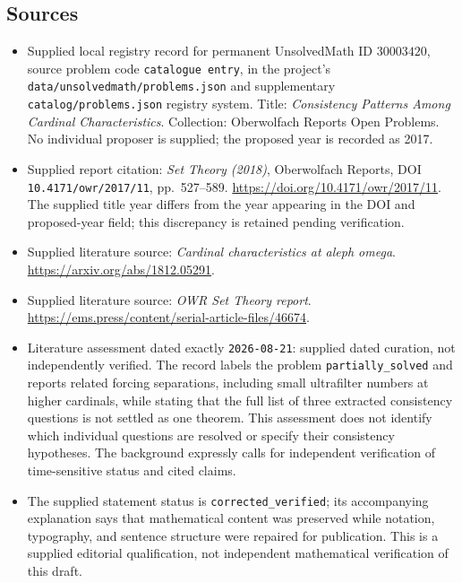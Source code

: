 \documentclass[11pt]{article}
\begin{document}
\subsection{Sources}
\begin{itemize}
\item Supplied local registry record for permanent UnsolvedMath ID \(30003420\), source problem code \texttt{catalogue entry}, in the project's \texttt{data/unsolvedmath/problems.json} and supplementary \texttt{catalog/problems.json} registry system. Title: \emph{Consistency Patterns Among Cardinal Characteristics}. Collection: Oberwolfach Reports Open Problems. No individual proposer is supplied; the proposed year is recorded as 2017.
\item Supplied report citation: \emph{Set Theory (2018)}, Oberwolfach Reports, DOI \texttt{10.4171/owr/2017/11}, pp.~527--589. \url{https://doi.org/10.4171/owr/2017/11}. The supplied title year differs from the year appearing in the DOI and proposed-year field; this discrepancy is retained pending verification.
\item Supplied literature source: \emph{Cardinal characteristics at aleph omega}. \url{https://arxiv.org/abs/1812.05291}.
\item Supplied literature source: \emph{OWR Set Theory report}. \url{https://ems.press/content/serial-article-files/46674}.
\item Literature assessment dated exactly \texttt{2026-08-21}: supplied dated curation, not independently verified. The record labels the problem \texttt{partially\_solved} and reports related forcing separations, including small ultrafilter numbers at higher cardinals, while stating that the full list of three extracted consistency questions is not settled as one theorem. This assessment does not identify which individual questions are resolved or specify their consistency hypotheses. The background expressly calls for independent verification of time-sensitive status and cited claims.
\item The supplied statement status is \texttt{corrected\_verified}; its accompanying explanation says that mathematical content was preserved while notation, typography, and sentence structure were repaired for publication. This is a supplied editorial qualification, not independent mathematical verification of this draft.
\end{itemize}
\end{document}
